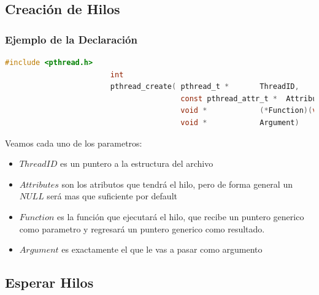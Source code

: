 \documentclass[12pt, fleqn]{report}                             %
\begin{document}
            \subsection{Creación de Hilos}

                \subsubsection{Ejemplo de la Declaración}
                    \begin{lstlisting}[language=C, gobble=24]
                        #include <pthread.h>
                        int
                        pthread_create( pthread_t *       ThreadID,
                                        const pthread_attr_t *  Attributes,
                                        void *            (*Function)(void*),
                                        void *            Argument)
                    \end{lstlisting}

                    Veamos cada uno de los parametros:
                    \begin{itemize}
                        \item $ThreadID$ es un puntero a la estructura del archivo
                        \item $Attributes$ son los atributos que tendrá el hilo, pero de forma
                            general un $NULL$ será mas que suficiente por default
                        \item $Function$ es la función que ejecutará el hilo, que recibe 
                            un puntero generico como parametro y regresará un puntero generico como
                            resultado.
                        \item $Argument$ es exactamente el que le vas a pasar como argumento
                    \end{itemize}


            \subsection{Esperar Hilos}
\end{document}
